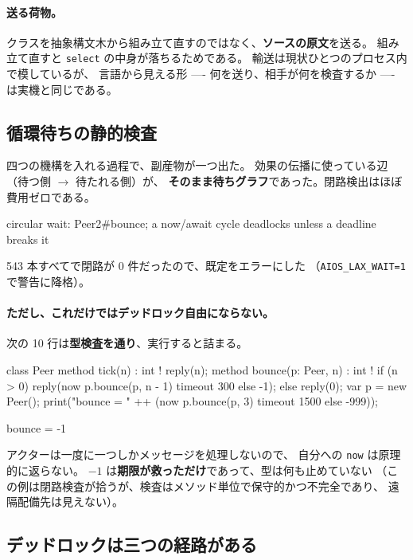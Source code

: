 \documentclass[11pt,a4paper]{ltjsarticle}
\theoremstyle{definition}
\theoremstyle{remark}
\begin{document}
\paragraph{送る荷物。}
クラスを抽象構文木から組み立て直すのではなく、\textbf{ソースの原文}を送る。
組み立て直すと \texttt{select} の中身が落ちるためである。
輸送は現状ひとつのプロセス内で模しているが、
言語から見える形 ---- 何を送り、相手が何を検査するか ---- は実機と同じである。

\subsection{循環待ちの静的検査}
\label{sec:deadlock}

四つの機構を入れる過程で、副産物が一つ出た。
効果の伝播に使っている辺（待つ側 $\to$ 待たれる側）が、
\textbf{そのまま待ちグラフ}であった。閉路検出はほぼ費用ゼロである。

\begin{term}
 circular wait: Peer2#bounce;
             a now/await cycle deadlocks unless a deadline breaks it
\end{term}

543 本すべてで閉路が 0 件だったので、既定をエラーにした
（\texttt{AIOS\_LAX\_WAIT=1} で警告に降格）。

\paragraph{ただし、これだけではデッドロック自由にならない。}
次の 10 行は\textbf{型検査を通り}、実行すると詰まる。

\begin{aipl}
class Peer {
  method tick(n) : int !{} { reply(n); }
  method bounce(p: Peer, n) : int !{} {
    if (n > 0) { reply(now p.bounce(p, n - 1) timeout 300 else -1); }
    else { reply(0); }
  }
}
var p = new Peer();
print("bounce = " ++ (now p.bounce(p, 3) timeout 1500 else -999));
\end{aipl}
\begin{term}
bounce = -1
\end{term}

アクターは一度に一つしかメッセージを処理しないので、
自分への \texttt{now} は原理的に返らない。
$-1$ は\textbf{期限が救っただけ}であって、型は何も止めていない
（この例は閉路検査が拾うが、検査はメソッド単位で保守的かつ不完全であり、
遠隔配備先は見えない）。

\subsection{デッドロックは三つの経路がある}
\label{sec:dl3}
\end{document}
